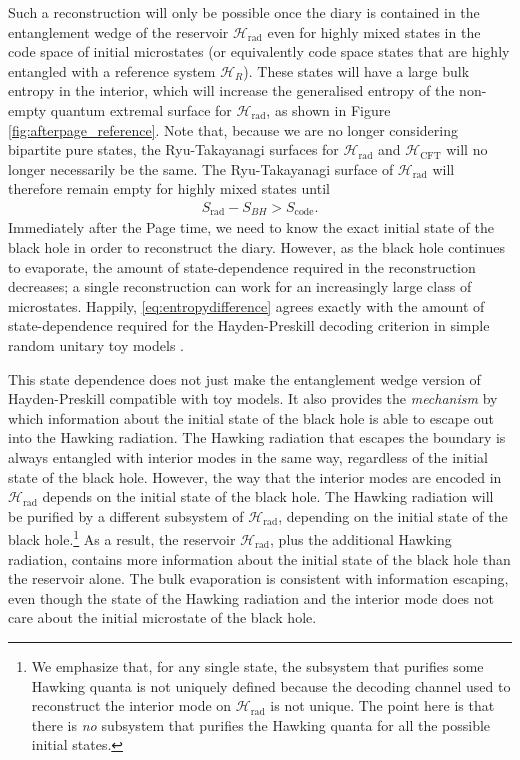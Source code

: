 \documentclass[11pt,a4paper]{article}
\newcommand{\Srad}{S_\text{rad} }
\begin{document}
Such a reconstruction will only be possible once the diary is contained in the entanglement wedge of the reservoir $\mathcal{H}_\text{rad}$ even for highly mixed states in the code space of initial microstates (or equivalently code space states that are highly entangled with a reference system $\mathcal{H}_R$). These states will have a large bulk entropy in the interior, which will increase the generalised entropy of the non-empty quantum extremal surface for $\mathcal{H}_\text{rad}$, as shown in Figure \ref{fig:afterpage_reference}. Note that, because we are no longer considering bipartite pure states, the Ryu-Takayanagi surfaces for $\mathcal{H}_\text{rad}$ and $\mathcal{H}_\text{CFT}$ will no longer necessarily be the same. The Ryu-Takayanagi surface of $\mathcal{H}_\text{rad}$ will therefore remain empty for highly mixed states until
\begin{align} \label{eq:entropydifference}
\Srad - S_{BH} > S_\text{code}.
\end{align}
Immediately after the Page time, we need to know the exact initial state of the black hole in order to reconstruct the diary. However, as the black hole continues to evaporate, the amount of state-dependence required in the reconstruction decreases; a single reconstruction can work for an increasingly large class of microstates. Happily, \eqref{eq:entropydifference} agrees exactly with the amount of state-dependence required for the Hayden-Preskill decoding criterion in simple random unitary toy models \cite{hayden2018learning}.

This state dependence does not just make the entanglement wedge version of Hayden-Preskill compatible with toy models. It also provides the \emph{mechanism} by which information about the initial state of the black hole is able to escape out into the Hawking radiation. The Hawking radiation that escapes the boundary is always entangled with interior modes in the same way, regardless of the initial state of the black hole. However, the way that the interior modes are encoded in $\mathcal{H}_\text{rad}$ depends on the initial state of the black hole. The Hawking radiation will be purified by a different subsystem of $\mathcal{H}_\text{rad}$, depending on the initial state of the black hole.\footnote{We emphasize that, for any single state, the subsystem that purifies some Hawking quanta is not uniquely defined because the decoding channel used to reconstruct the interior mode on $\mathcal{H}_\text{rad}$ is not unique. The point here is that there is \emph{no} subsystem that purifies the Hawking quanta for all the possible initial states.} As a result, the reservoir $\mathcal{H}_\text{rad}$, plus the additional Hawking radiation, contains more information about the initial state of the black hole than the reservoir alone. The bulk evaporation is consistent with information escaping, even though the state of the Hawking radiation and the interior mode does not care about the initial microstate of the black hole.
\end{document}
